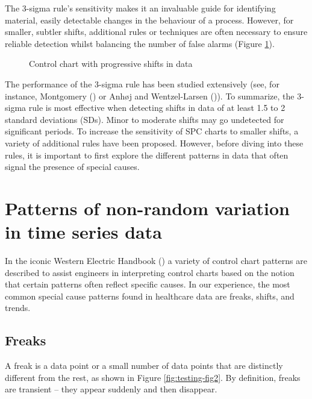 \documentclass[
]{book}
\makeatletter
\newcommand*\pandocbounded[1]{%
  \sbox\pandoc@box{#1}%
  \Gscale@div\@tempa{\textheight}{\dimexpr\ht\pandoc@box+\dp\pandoc@box\relax}%
  \Gscale@div\@tempb{\linewidth}{\wd\pandoc@box}%
  \ifdim\@tempb\p@<\@tempa\p@\let\@tempa\@tempb\fi%
  \ifdim\@tempa\p@<\p@\scalebox{\@tempa}{\usebox\pandoc@box}%
  \else\usebox{\pandoc@box}%
  \fi%
}
\makeatother
\begin{document}
The 3-sigma rule's sensitivity makes it an invaluable guide for identifying material, easily detectable changes in the behaviour of a process. However, for smaller, subtler shifts, additional rules or techniques are often necessary to ensure reliable detection whilst balancing the number of false alarms (Figure \ref{fig:testing-fig1}).

\begin{figure}
\centering
\pandocbounded{}
\caption{\label{fig:testing-fig1}Control chart with progressive shifts in data}
\end{figure}

The performance of the 3-sigma rule has been studied extensively (see, for instance, Montgomery () or Anhøj and Wentzel-Larsen ()). To summarize, the 3-sigma rule is most effective when detecting shifts in data of at least 1.5 to 2 standard deviations (SDs). Minor to moderate shifts may go undetected for significant periods. To increase the sensitivity of SPC charts to smaller shifts, a variety of additional rules have been proposed. However, before diving into these rules, it is important to first explore the different patterns in data that often signal the presence of special causes.

\section{Patterns of non-random variation in time series data}\label{patterns-of-non-random-variation-in-time-series-data}

In the iconic Western Electric Handbook () a variety of control chart patterns are described to assist engineers in interpreting control charts based on the notion that certain patterns often reflect specific causes. In our experience, the most common special cause patterns found in healthcare data are freaks, shifts, and trends.

\subsection{Freaks}\label{freaks}

A freak is a data point or a small number of data points that are distinctly different from the rest, as shown in Figure \ref{fig:testing-fig2}. By definition, freaks are transient -- they appear suddenly and then disappear.
\end{document}
